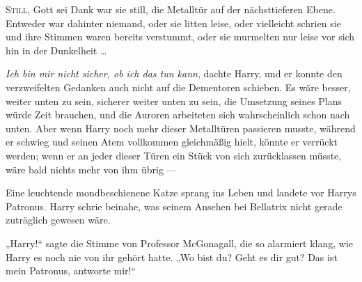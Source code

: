 
\lettrine{S}{till}, Gott sei Dank war sie still, die Metalltür auf der nächsttieferen Ebene. Entweder war dahinter niemand, oder sie litten leise, oder vielleicht schrien sie und ihre Stimmen waren bereits verstummt, oder sie murmelten nur leise vor sich hin in der Dunkelheit …

\emph{Ich bin mir nicht sicher, ob ich das tun kann}, dachte Harry, und er konnte den verzweifelten Gedanken auch nicht auf die Dementoren schieben. Es wäre besser, weiter unten zu sein, sicherer weiter unten zu sein, die Umsetzung seines Plans würde Zeit brauchen, und die Auroren arbeiteten sich wahrscheinlich schon nach unten. Aber wenn Harry noch mehr dieser Metalltüren passieren musste, während er schwieg und seinen Atem vollkommen gleichmäßig hielt, könnte er verrückt werden; wenn er an jeder dieser Türen ein Stück von sich zurücklassen müsste, wäre bald nichts mehr von ihm übrig —

Eine leuchtende mondbeschienene Katze sprang ins Leben und landete vor Harrys Patronus. Harry schrie beinahe, was seinem Ansehen bei Bellatrix nicht gerade zuträglich gewesen wäre.

„Harry!“ sagte die Stimme von Professor McGonagall, die so alarmiert klang, wie Harry es noch nie von ihr gehört hatte.
„Wo bist du? Geht es dir gut? Das ist mein Patronus, antworte mir!“

